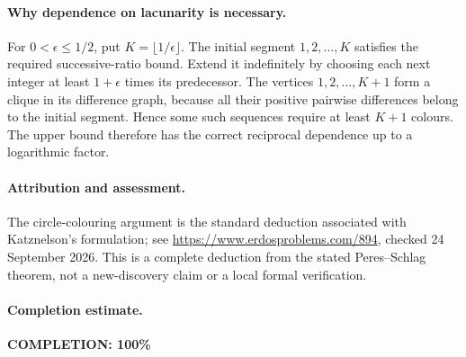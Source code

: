 \paragraph{Why dependence on lacunarity is necessary.}
For \(0<\epsilon\leq1/2\), put \(K=\lfloor1/\epsilon\rfloor\).
The initial segment \(1,2,\ldots,K\) satisfies the required
successive-ratio bound. Extend it indefinitely by choosing each
next integer at least \(1+\epsilon\) times its predecessor.
The vertices \(1,2,\ldots,K+1\) form a clique in its difference
graph, because all their positive pairwise differences belong
to the initial segment. Hence some such sequences require
at least \(K+1\) colours. The upper bound therefore has the
correct reciprocal dependence up to a logarithmic factor.

\paragraph{Attribution and assessment.}
The circle-colouring argument is the standard deduction
associated with Katznelson's formulation; see
\url{https://www.erdosproblems.com/894}, checked 24 September 2026.
This is a complete deduction from the stated Peres--Schlag
theorem, not a new-discovery claim or a local formal verification.

\paragraph{Completion estimate.}
\textbf{COMPLETION: 100\%}
